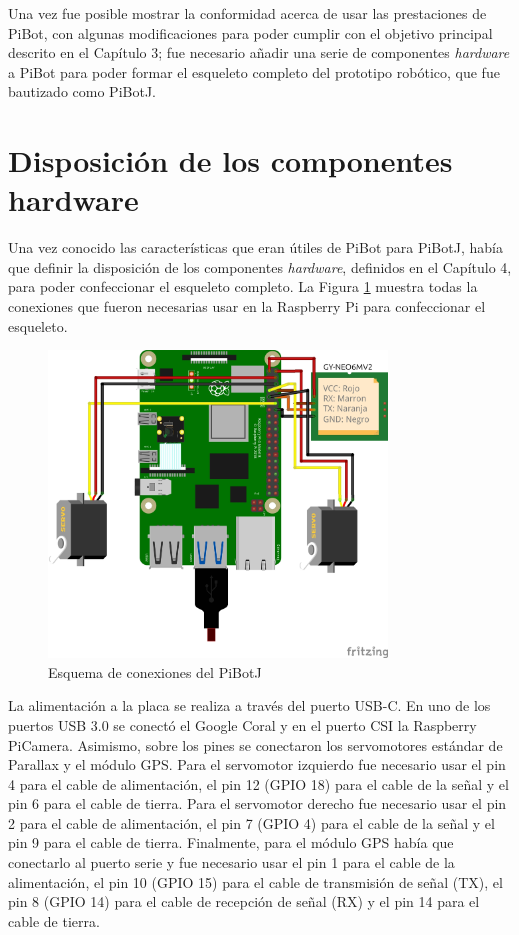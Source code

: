 Una vez fue posible mostrar la conformidad acerca de usar las prestaciones de PiBot, con algunas modificaciones para poder cumplir con el objetivo principal descrito en el Capítulo 3; fue necesario añadir una serie de componentes \textit{hardware} a PiBot para poder formar el esqueleto completo del prototipo robótico, que fue bautizado como PiBotJ.

\section{Disposición de los componentes hardware}

Una vez conocido las características que eran útiles de PiBot para PiBotJ, había que definir la disposición de los componentes \textit{hardware}, definidos en el Capítulo 4, para poder confeccionar el esqueleto completo. La Figura \ref{fig:fritzzing} muestra todas la conexiones que fueron necesarias usar en la Raspberry Pi para confeccionar el esqueleto. 

\begin{figure} [h!]
	\begin{center}
		\includegraphics[width=9cm]{figs/cap5/modelocompleto_bb.jpg}
	\end{center}
	\caption{Esquema de conexiones del PiBotJ} 
	\label{fig:fritzzing}
\end{figure}


La alimentación a la placa se realiza a través del puerto USB-C. En uno de los puertos USB 3.0 se conectó el Google Coral y en el puerto CSI la  Raspberry PiCamera. Asimismo, sobre los pines se conectaron los servomotores estándar de Parallax y el módulo GPS. Para el servomotor izquierdo fue necesario usar el pin 4 para el cable de alimentación, el pin 12 (GPIO 18) para el cable de la señal y el pin 6 para el cable de tierra. Para el servomotor derecho fue necesario usar el pin 2 para el cable de alimentación, el pin 7 (GPIO 4) para el cable de la señal y el pin 9 para el cable de tierra. Finalmente, para el módulo GPS había que conectarlo al puerto serie y fue necesario usar el pin 1 para el cable de la alimentación, el pin 10 (GPIO 15) para el cable de transmisión de señal (TX), el pin 8 (GPIO 14) para el cable de recepción de señal (RX) y el pin 14 para el cable de tierra. 

